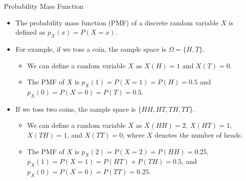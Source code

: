 \documentclass[handout]{beamer}
\begin{document}
\begin{frame}{Probability Mass Function}
    \begin{itemize}
        \item The probability mass function (PMF) of a discrete random variable $X$ is defined as $p_X(x) = P(X = x)$.
        \item For example, if we toss a coin, the sample space is  $\Omega = \{H, T\}$. 
        \begin{itemize}
            \item We can define a random variable $X$ as $X(H) = 1$ and $X(T) = 0$.
            \item The PMF of $X$ is $p_X(1) = P(X = 1) = P(H) = 0.5$ and $p_X(0) = P(X = 0) = P(T) = 0.5$.
        \end{itemize}
        \item If we toss two coins, the sample space is $\{HH, HT, TH, TT\}$. 
        \begin{itemize}
            \item We can define a random variable $X$ as $X(HH) = 2$, $X(HT) = 1$, $X(TH) = 1$, and $X(TT) = 0$, where $X$ denotes the number of heads.
            \item The PMF of $X$ is $p_X(2) = P(X = 2) = P(HH) = 0.25$, $p_X(1) = P(X = 1) = P(HT) + P(TH) = 0.5$, and $p_X(0) = P(X = 0) = P(TT) = 0.25$.
        \end{itemize}
    \end{itemize}
    
\end{frame}
\end{document}
